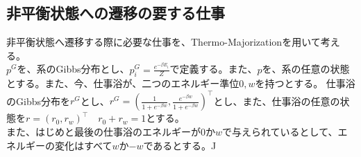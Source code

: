 \documentclass[a4paper,11pt]{jsarticle}
\numberwithin{equation}{section}
\begin{document}
\subsection{非平衡状態への遷移の要する仕事}
非平衡状態へ遷移する際に必要な仕事を、Thermo-Majorizationを用いて考える。\\
$p^G$を、系のGibbs分布とし、$p_{i}^G = \frac{e^{-\beta E_i}}{Z}$で定義する。また、$p$を、系の任意の状態とする。また、今、仕事浴が、二つのエネルギー準位$0,w$を持つとする。
仕事浴のGibbs分布を$r^G$とし、$r^G = (\frac{1}{1+e^{-\beta w}},\frac{e^{-\beta w}}{1+e^{-\beta w}})^{\top}$とし、また、仕事浴の任意の状態を$r=(r_0,r_w)^{\top} \quad r_0+r_w=1$とする。\\
また、はじめと最後の仕事浴のエネルギーが$0$か$w$で与えられているとして、エネルギーの変化はすべて$w$か$-w$であるとする。^^
\end{document}
